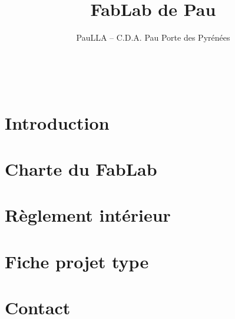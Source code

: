 \documentclass[a5paper,11pt]{article} %
\title{FabLab de Pau} %
\author{PauLLA -- C.D.A. Pau Porte des Pyrénées}
\begin{document}
\thispagestyle{empty}

\pagebreak
~ \vfill %
\tableofcontents\thispagestyle{empty}
~ \vfill %
\pagebreak\section{Introduction}

\pagebreak\section{Charte du FabLab}

\pagebreak\section{Règlement intérieur}

\pagebreak\section{Fiche projet type}

\pagebreak\section{Contact}

\end{document}
